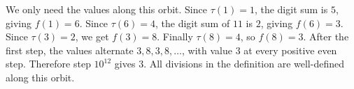 We only need the values along this orbit. Since $\tau(1)=1$, the digit sum is $5$, giving $f(1)=6$. Since $\tau(6)=4$, the digit sum of $11$ is $2$, giving $f(6)=3$. Since $\tau(3)=2$, we get $f(3)=8$. Finally $\tau(8)=4$, so $f(8)=3$. After the first step, the values alternate $3,8,3,8,\ldots$, with value $3$ at every positive even step. Therefore step $10^{12}$ gives $\boxed3$. All divisions in the definition are well-defined along this orbit.
